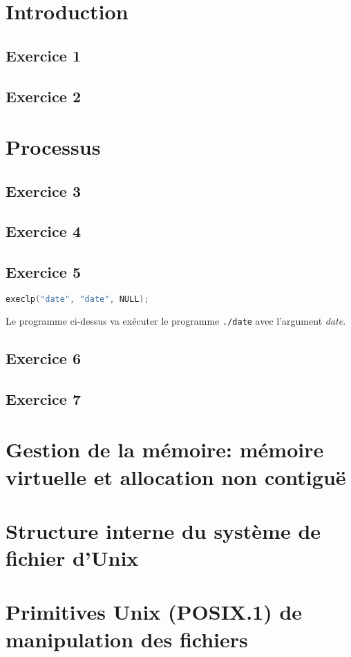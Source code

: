 \documentclass[12pt,a4paper,openany]{book}
\begin{document}
	\setcounter{tocdepth}{2}
	\setcounter{secnumdepth}{3}
	\maketitle
	\tableofcontents
	\chapter{Introduction}
		\section{Exercice 1}
		
		
		\section{Exercice 2}
		
		
	\chapter{Processus}
		\section{Exercice 3}
		
		\section{Exercice 4}
		
		\section{Exercice 5}
\begin{lstlisting}[language=C, numbers=none]
execlp("date", "date", NULL);
\end{lstlisting}
Le programme ci-dessus va exécuter le programme \texttt{./date} avec l'argument \textit{date}.
		\section{Exercice 6}
		\section{Exercice 7}
	\chapter{Gestion de la mémoire: mémoire virtuelle et allocation non contiguë}
	\chapter{Structure interne du système de fichier d'Unix}
	\chapter{Primitives Unix (POSIX.1) de manipulation des fichiers}
\end{document}
